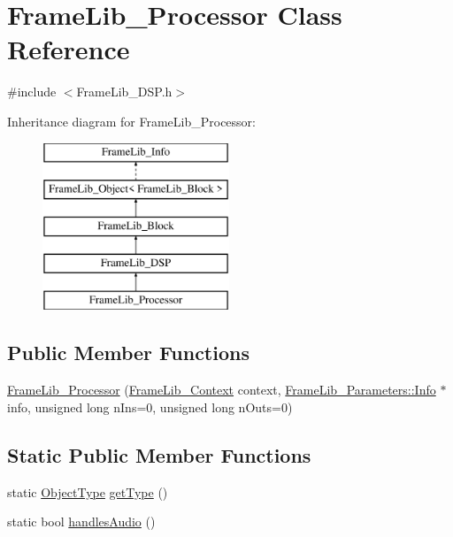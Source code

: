 \hypertarget{class_frame_lib___processor}{}\section{Frame\+Lib\+\_\+\+Processor Class Reference}
\label{class_frame_lib___processor}


{\ttfamily \#include $<$Frame\+Lib\+\_\+\+D\+S\+P.\+h$>$}

Inheritance diagram for Frame\+Lib\+\_\+\+Processor\+:\begin{figure}[H]
\begin{center}
\leavevmode
\includegraphics[height=5.000000cm]{class_frame_lib___processor}
\end{center}
\end{figure}
\subsection*{Public Member Functions}
\begin{DoxyCompactItemize}
\item 
\hyperlink{class_frame_lib___processor_aaa48ccb4d8b92b2d51408499e2d52e8c}{Frame\+Lib\+\_\+\+Processor} (\hyperlink{class_frame_lib___context}{Frame\+Lib\+\_\+\+Context} context, \hyperlink{class_frame_lib___parameters_1_1_info}{Frame\+Lib\+\_\+\+Parameters\+::\+Info} $\ast$info, unsigned long n\+Ins=0, unsigned long n\+Outs=0)
\end{DoxyCompactItemize}
\subsection*{Static Public Member Functions}
\begin{DoxyCompactItemize}
\item 
static \hyperlink{_frame_lib___types_8h_a842c5e2e69277690b064bf363c017980}{Object\+Type} \hyperlink{class_frame_lib___processor_a9cf7b310f4d1ca8843b201d692fcf544}{get\+Type} ()
\item 
static bool \hyperlink{class_frame_lib___processor_a77869c3007f363ce914d9e0073953660}{handles\+Audio} ()
\end{DoxyCompactItemize}
